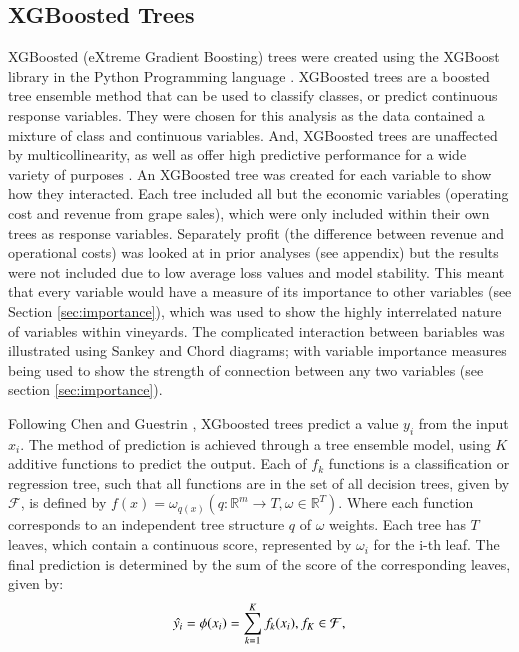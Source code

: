 \documentclass[review,12pt,authoryear]{elsarticle}
\begin{document}
\begin{linenumbers}
\subsection{XGBoosted Trees}
XGBoosted (eXtreme Gradient Boosting) trees were created using the XGBoost library \citep{chenXGBoostScalableTree2016} in the Python Programming language \citep{g.vanrossumPythonTutorialTechnical1995}. XGBoosted trees are a boosted tree ensemble method that can be used to classify classes, or predict continuous response variables. They were chosen for this analysis as the data contained a mixture of class and continuous variables. And, XGBoosted trees are unaffected by multicollinearity, as well as offer high predictive performance for a wide variety of purposes \citep{chenXGBoostScalableTree2016}. An XGBoosted tree was created for each variable to show how they interacted. Each tree included all but the economic variables (operating cost and revenue from grape sales), which were only included within their own trees as response variables. Separately profit (the difference between revenue and operational costs) was looked at in prior analyses (see appendix) but the results were not included due to low average loss values and model stability. This meant that every variable would have a measure of its importance to other variables (see Section \ref{sec:importance}), which was used to show the highly interrelated nature of variables within vineyards. The complicated interaction between bariables was illustrated using Sankey and Chord diagrams; with variable importance measures being used to show the strength of connection between any two variables (see section \ref{sec:importance}).
\par
Following Chen and Guestrin \citep{chenXGBoostScalableTree2016}, XGboosted trees predict a value $y_i$ from the input $x_i$. The method of prediction is achieved through a tree ensemble model, using $K$ additive functions to predict the output. Each of $f_k$ functions is a classification or regression tree, such that all functions are in the set of all decision trees, given by $\mathcal{F}$, is defined by ${f(x) = \omega_{q(x)}}(q : \mathbb{R}^m \rightarrow T, \omega \in \mathbb{R}^T)$. Where each function corresponds to an independent tree structure $q$ of $\omega$ weights. Each tree has $T$ leaves, which contain a continuous score, represented by $\omega_i$ for the i-th leaf. The final prediction is determined by the sum of the score of the corresponding leaves, given by:
\begin{equation}
 \hat{y_i}=\phi(x_i)=\sum_{k=1}^{K}{f_{k}(x_{i})}, \space f_{K}\in \mathcal{F},
\end{equation}


\end{linenumbers}
\end{document}
